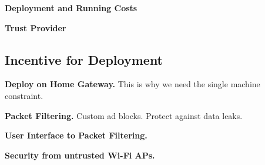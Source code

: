 \noindent\textbf{Deployment and Running Costs}

\noindent\textbf{Trust Provider}

\subsection{Incentive for Deployment}

\noindent \textbf{Deploy on Home Gateway.}
This is why we need the single machine constraint. 

\noindent \textbf{Packet Filtering.}
Custom ad blocks. Protect against data leaks. 

\noindent \textbf{User Interface to Packet Filtering.}

\noindent \textbf{Security from untrusted Wi-Fi APs.}




